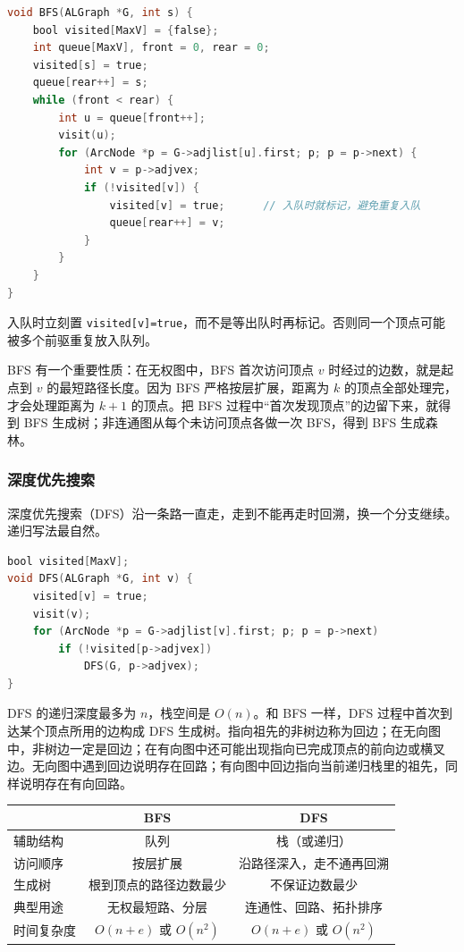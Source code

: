 \begin{lstlisting}[language=C]
void BFS(ALGraph *G, int s) {
    bool visited[MaxV] = {false};
    int queue[MaxV], front = 0, rear = 0;
    visited[s] = true;
    queue[rear++] = s;
    while (front < rear) {
        int u = queue[front++];
        visit(u);
        for (ArcNode *p = G->adjlist[u].first; p; p = p->next) {
            int v = p->adjvex;
            if (!visited[v]) {
                visited[v] = true;      // 入队时就标记，避免重复入队
                queue[rear++] = v;
            }
        }
    }
}
\end{lstlisting}

入队时立刻置 \texttt{visited[v]=true}，而不是等出队时再标记。否则同一个顶点可能被多个前驱重复放入队列。

BFS 有一个重要性质：在无权图中，BFS 首次访问顶点 $v$ 时经过的边数，就是起点到 $v$ 的最短路径长度。因为 BFS 严格按层扩展，距离为 $k$ 的顶点全部处理完，才会处理距离为 $k+1$ 的顶点。把 BFS 过程中“首次发现顶点”的边留下来，就得到 BFS 生成树；非连通图从每个未访问顶点各做一次 BFS，得到 BFS 生成森林。

\subsubsection{深度优先搜索}

深度优先搜索（DFS）沿一条路一直走，走到不能再走时回溯，换一个分支继续。递归写法最自然。

\begin{lstlisting}[language=C]
bool visited[MaxV];
void DFS(ALGraph *G, int v) {
    visited[v] = true;
    visit(v);
    for (ArcNode *p = G->adjlist[v].first; p; p = p->next)
        if (!visited[p->adjvex])
            DFS(G, p->adjvex);
}
\end{lstlisting}

DFS 的递归深度最多为 $n$，栈空间是 $O(n)$。和 BFS 一样，DFS 过程中首次到达某个顶点所用的边构成 DFS 生成树。指向祖先的非树边称为回边；在无向图中，非树边一定是回边；在有向图中还可能出现指向已完成顶点的前向边或横叉边。无向图中遇到回边说明存在回路；有向图中回边指向当前递归栈里的祖先，同样说明存在有向回路。

\begin{center}
\begin{tabular}{lcc}
\toprule
 & BFS & DFS \\
\midrule
辅助结构 & 队列 & 栈（或递归） \\
访问顺序 & 按层扩展 & 沿路径深入，走不通再回溯 \\
生成树 & 根到顶点的路径边数最少 & 不保证边数最少 \\
典型用途 & 无权最短路、分层 & 连通性、回路、拓扑排序 \\
时间复杂度 & $O(n+e)$ 或 $O(n^2)$ & $O(n+e)$ 或 $O(n^2)$ \\
\bottomrule
\end{tabular}
\end{center}

